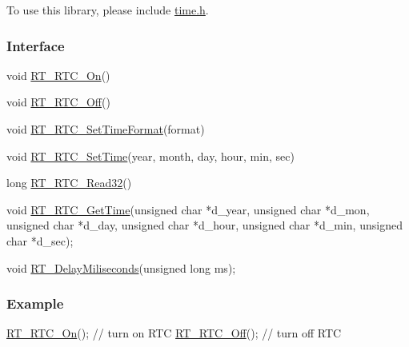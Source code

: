 To use this library, please include {\ttfamily \mbox{\hyperlink{a00164}{time.\+h}}}.

\subsubsection*{Interface}


\begin{DoxyCode}
\textcolor{keywordtype}{void} \mbox{\hyperlink{a00164_abcec88fd1699e238435a90f1b49f01fc}{RT\_RTC\_On}}()

void \mbox{\hyperlink{a00164_ad065bdfa3138a773950a7d5e9e9f863a}{RT\_RTC\_Off}}()

\textcolor{keywordtype}{void} \mbox{\hyperlink{a00164_a4342706ea208fe0adff35bfa3c78b87c}{RT\_RTC\_SetTimeFormat}}(format)

\textcolor{keywordtype}{void} \mbox{\hyperlink{a00164_a8929da3f9ad422dd07f18d603c63b7b7}{RT\_RTC\_SetTime}}(year, month, day, hour, min, sec)

\textcolor{keywordtype}{long} \mbox{\hyperlink{a00164_a61ac395d30cde55137bf04acaec570f0}{RT\_RTC\_Read32}}()

\textcolor{keywordtype}{void} \mbox{\hyperlink{a00161_ae30dec10f77cab56a66ee070fbe6a490}{RT\_RTC\_GetTime}}(\textcolor{keywordtype}{unsigned} \textcolor{keywordtype}{char} *d\_year, \textcolor{keywordtype}{unsigned} \textcolor{keywordtype}{char} *d\_mon, \textcolor{keywordtype}{unsigned} \textcolor{keywordtype}{char} *d\_day,
               \textcolor{keywordtype}{unsigned} \textcolor{keywordtype}{char} *d\_hour, \textcolor{keywordtype}{unsigned} \textcolor{keywordtype}{char} *d\_min, \textcolor{keywordtype}{unsigned} \textcolor{keywordtype}{char} *d\_sec);

\textcolor{keywordtype}{void} \mbox{\hyperlink{a00161_a960534919351d6e419e70a78521e87da}{RT\_DelayMiliseconds}}(\textcolor{keywordtype}{unsigned} \textcolor{keywordtype}{long} ms);
\end{DoxyCode}


\subsubsection*{Example}


\begin{DoxyCode}
\mbox{\hyperlink{a00164_abcec88fd1699e238435a90f1b49f01fc}{RT\_RTC\_On}}();     \textcolor{comment}{// turn on RTC}
\mbox{\hyperlink{a00164_ad065bdfa3138a773950a7d5e9e9f863a}{RT\_RTC\_Off}}();    \textcolor{comment}{// turn off RTC}
\end{DoxyCode}
 